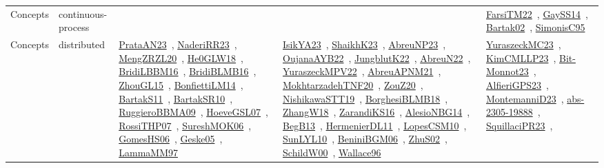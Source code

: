 {\begin{longtable}{lp{3cm}>{\raggedright\arraybackslash}p{6cm}>{\raggedright\arraybackslash}p{6cm}>{\raggedright\arraybackslash}p{8cm}}
Concepts & continuous-process &  &  & \href{works/FarsiTM22.pdf}{FarsiTM22}~\cite{FarsiTM22}, \href{works/GaySS14.pdf}{GaySS14}~\cite{GaySS14}, \href{works/Bartak02.pdf}{Bartak02}~\cite{Bartak02}, \href{works/SimonisC95.pdf}{SimonisC95}~\cite{SimonisC95}\\
Concepts & distributed & \href{works/PrataAN23.pdf}{PrataAN23}~\cite{PrataAN23}, \href{works/NaderiRR23.pdf}{NaderiRR23}~\cite{NaderiRR23}, \href{works/MengZRZL20.pdf}{MengZRZL20}~\cite{MengZRZL20}, \href{works/He0GLW18.pdf}{He0GLW18}~\cite{He0GLW18}, \href{works/BridiLBBM16.pdf}{BridiLBBM16}~\cite{BridiLBBM16}, \href{works/BridiBLMB16.pdf}{BridiBLMB16}~\cite{BridiBLMB16}, \href{works/ZhouGL15.pdf}{ZhouGL15}~\cite{ZhouGL15}, \href{works/BonfiettiLM14.pdf}{BonfiettiLM14}~\cite{BonfiettiLM14}, \href{works/BartakS11.pdf}{BartakS11}~\cite{BartakS11}, \href{works/BartakSR10.pdf}{BartakSR10}~\cite{BartakSR10}, \href{works/RuggieroBBMA09.pdf}{RuggieroBBMA09}~\cite{RuggieroBBMA09}, \href{works/HoeveGSL07.pdf}{HoeveGSL07}~\cite{HoeveGSL07}, \href{works/RossiTHP07.pdf}{RossiTHP07}~\cite{RossiTHP07}, \href{works/SureshMOK06.pdf}{SureshMOK06}~\cite{SureshMOK06}, \href{works/GomesHS06.pdf}{GomesHS06}~\cite{GomesHS06}, \href{works/Geske05.pdf}{Geske05}~\cite{Geske05}, \href{works/LammaMM97.pdf}{LammaMM97}~\cite{LammaMM97} & \href{works/IsikYA23.pdf}{IsikYA23}~\cite{IsikYA23}, \href{works/ShaikhK23.pdf}{ShaikhK23}~\cite{ShaikhK23}, \href{works/AbreuNP23.pdf}{AbreuNP23}~\cite{AbreuNP23}, \href{works/OujanaAYB22.pdf}{OujanaAYB22}~\cite{OujanaAYB22}, \href{works/JungblutK22.pdf}{JungblutK22}~\cite{JungblutK22}, \href{works/AbreuN22.pdf}{AbreuN22}~\cite{AbreuN22}, \href{works/YuraszeckMPV22.pdf}{YuraszeckMPV22}~\cite{YuraszeckMPV22}, \href{works/AbreuAPNM21.pdf}{AbreuAPNM21}~\cite{AbreuAPNM21}, \href{works/MokhtarzadehTNF20.pdf}{MokhtarzadehTNF20}~\cite{MokhtarzadehTNF20}, \href{works/ZouZ20.pdf}{ZouZ20}~\cite{ZouZ20}, \href{works/NishikawaSTT19.pdf}{NishikawaSTT19}~\cite{NishikawaSTT19}, \href{works/BorghesiBLMB18.pdf}{BorghesiBLMB18}~\cite{BorghesiBLMB18}, \href{works/ZhangW18.pdf}{ZhangW18}~\cite{ZhangW18}, \href{works/ZarandiKS16.pdf}{ZarandiKS16}~\cite{ZarandiKS16}, \href{works/AlesioNBG14.pdf}{AlesioNBG14}~\cite{AlesioNBG14}, \href{works/BegB13.pdf}{BegB13}~\cite{BegB13}, \href{works/HermenierDL11.pdf}{HermenierDL11}~\cite{HermenierDL11}, \href{works/LopesCSM10.pdf}{LopesCSM10}~\cite{LopesCSM10}, \href{works/SunLYL10.pdf}{SunLYL10}~\cite{SunLYL10}, \href{works/BeniniBGM06.pdf}{BeniniBGM06}~\cite{BeniniBGM06}, \href{works/ZhuS02.pdf}{ZhuS02}~\cite{ZhuS02}, \href{works/SchildW00.pdf}{SchildW00}~\cite{SchildW00}, \href{works/Wallace96.pdf}{Wallace96}~\cite{Wallace96} & \href{works/YuraszeckMC23.pdf}{YuraszeckMC23}~\cite{YuraszeckMC23}, \href{works/KimCMLLP23.pdf}{KimCMLLP23}~\cite{KimCMLLP23}, \href{works/Bit-Monnot23.pdf}{Bit-Monnot23}~\cite{Bit-Monnot23}, \href{works/AlfieriGPS23.pdf}{AlfieriGPS23}~\cite{AlfieriGPS23}, \href{works/MontemanniD23.pdf}{MontemanniD23}~\cite{MontemanniD23}, \href{works/abs-2305-19888.pdf}{abs-2305-19888}~\cite{abs-2305-19888}, \href{works/SquillaciPR23.pdf}{SquillaciPR23}~\cite{SquillaciPR23}, 
\end{longtable}}
